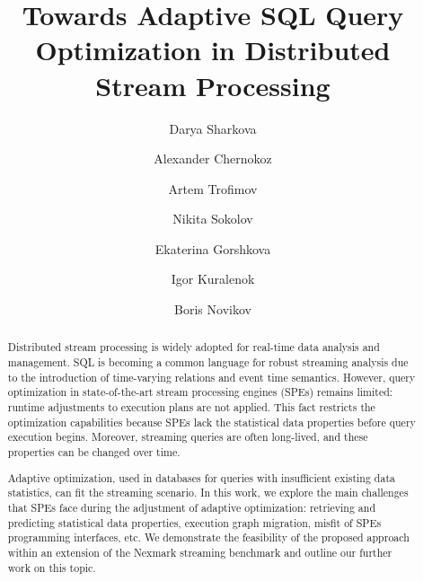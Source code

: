 \documentclass[runningheads]{llncs}
\theoremstyle{remark}
\begin{document}
%
\title{Towards Adaptive SQL Query Optimization in Distributed Stream Processing}
%
%
\author{Darya Sharkova \and
Alexander Chernokoz \and
Artem Trofimov \and
Nikita Sokolov \and
Ekaterina Gorshkova \and
Igor Kuralenok\and
Boris Novikov}
%
%
\maketitle              %
%
\begin{abstract}
Distributed stream processing is widely adopted for real-time data analysis and management. SQL is becoming a common language for robust streaming analysis due to the introduction of time-varying relations and event time semantics. However, query optimization in state-of-the-art stream processing engines (SPEs) remains limited: runtime adjustments to execution plans are not applied. This fact restricts the optimization capabilities because SPEs lack the statistical data properties before query execution begins. Moreover, streaming queries are often long-lived, and these properties can be changed over time. 

Adaptive optimization, used in databases for queries with insufficient existing data statistics, can fit the streaming scenario. In this work, we explore the main challenges that SPEs face during the adjustment of adaptive optimization: retrieving and predicting statistical data properties, execution graph migration, misfit of SPEs programming interfaces, etc. We demonstrate the feasibility of the proposed approach within an extension of the Nexmark streaming benchmark and outline our further work on this topic.

\end{abstract}
\end{document}
